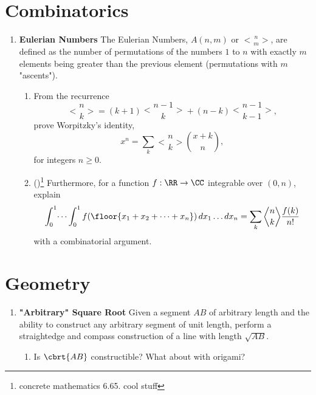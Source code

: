 \documentclass[11pt]{scrartcl}
\begin{document}
\section{Combinatorics}
\begin{enumerate}[label=\textbf{C\arabic*}.]
    \item \textbf{Eulerian Numbers} \newline
    The Eulerian Numbers, $A(n, m)$ or $\genfrac<>{0pt}{}{n}{m}$, are defined as the number of permutations of the numbers $1$ to $n$ with exactly $m$ elements being greater than the previous element (permutations with $m$ "ascents").

    \begin{enumerate}
        \item From the recurrence
        \[ \genfrac<>{0pt}{}{n}{k} = (k + 1)\genfrac<>{0pt}{}{n-1}{k} + (n - k)\genfrac<>{0pt}{}{n-1}{k-1}, \]
        prove Worpitzky's identity,
        \[ x^n = \sum_{k} \genfrac<>{0pt}{}{n}{k} \binom{x+k}{n}, \]
        for integers $n \geq 0$.

        \item (\fullchili)\footnote{concrete mathematics 6.65. cool stuff} Furthermore, for a function $f : \RR \to \CC$ integrable over $(0, n)$, explain
        \[ \int_0^1 \dots \int_0^1 f(\floor{x_1 + x_2 + \dots + x_n}) \, dx_1 \dots dx_n = \sum_{k} \genfrac<>{0pt}{}{n}{k} \frac{f(k)}{n!} \]
        with a combinatorial argument.
    \end{enumerate}
\end{enumerate}

\newpage
\section{Geometry}
\begin{enumerate}[label=\textbf{G\arabic*}.]
    \item \textbf{"Arbitrary" Square Root} \newline
    Given a segment $AB$ of arbitrary length and the ability to construct any arbitrary segment of unit length, perform a straightedge and compass construction of a line with length $\sqrt{AB}$.
    
    \begin{enumerate}
        \item Is $\cbrt{AB}$ constructible? What about with origami?
    \end{enumerate}
\end{enumerate}
\end{document}
